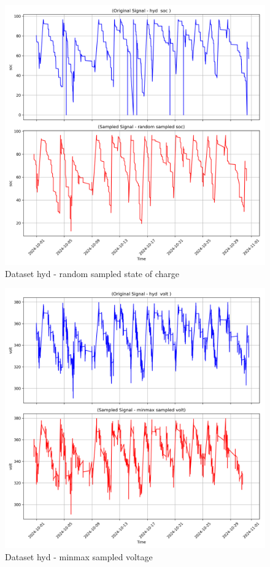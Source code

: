 \begin{figure}
    \centering
    \includegraphics[width=1\linewidth]{screenshots/hyd/random_sampled_soc_screenshot.png}
    \caption{Dataset hyd - random sampled state of charge }
    \label{fig:hyd_random_sampled_soc_screenshot}
\end{figure}
\begin{figure}
    \centering
    \includegraphics[width=1\linewidth]{screenshots/hyd/minmax_sampled_volt_screenshot.png}
    \caption{Dataset hyd - minmax sampled voltage }
    \label{fig:hyd_minmax_sampled_volt_screenshot}
\end{figure}
